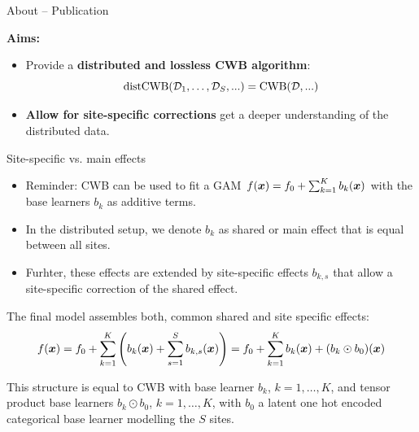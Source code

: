 \documentclass[t,10pt]{beamer}
\newcommand{\todo}{{\color{red}\textbf{TODO:}}\hspace{0.1cm}}
\begin{document}
\begin{frame}{About -- Publication}
  \vspace{-0.2cm}
  \begin{figure}
    \centering
  \end{figure}
  \vspace{-0.2cm}
  \textbf{Aims:}
  \begin{itemize}
    \item
      Provide a \textbf{distributed and lossless CWB algorithm}: \[\operatorname{distCWB}(\mathcal{D}_1, \dots, \mathcal{D}_S, ...) = \operatorname{CWB}(\mathcal{D}, ...)\]
    \item
      \textbf{Allow for site-specific corrections} get a deeper understanding of the distributed data.
  \end{itemize}

\end{frame}

\begin{frame}{Site-specific vs. main effects}
  \begin{itemize}
    \item
      Reminder: CWB can be used to fit a GAM $f(\bm{x}) = f_0 + \sum_{k=1}^K b_k(\bm{x})$ with the base learners $b_k$ as additive terms.
    \item
      In the distributed setup, we denote $b_k$ as shared or main effect that is equal between all sites.

    \item
      Furhter, these effects are extended by site-specific effects $b_{k,s}$ that allow a site-specific correction of the shared effect.
  \end{itemize}

  The final model assembles both, common shared and site specific effects:
  \[f(\bm{x}) = f_0 + \sum_{k=1}^K\left(b_k(\bm{x}) + \sum_{s=1}^S b_{k,s}(\bm{x})\right) = f_0 + \sum_{k=1}^K b_k(\bm{x}) + (b_k \odot b_0)(\bm{x})\]

  This structure is equal to CWB with base learner $b_k$, $k = 1, \dots, K$, and tensor product base learners $b_k \odot b_0$, $k = 1, \dots, K$, with $b_0$ a latent one hot encoded categorical base learner modelling the $S$ sites.
\end{frame}
\end{document}
